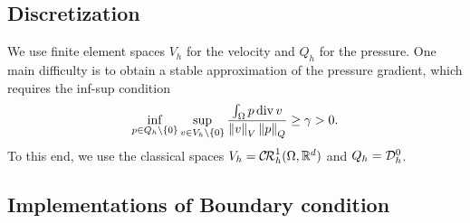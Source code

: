 \subsection{Discretization}\label{subsec:}
%
We use finite element spaces $V_h$ for the velocity and $Q_h$ for the pressure. One main difficulty is to obtain a stable approximation of the pressure gradient, which requires the inf-sup condition
%
\begin{equation}\label{eq:stokes:infsupgrad}
\inf_{p\in Q_h\setminus\left\{0\right\}}\sup_{v\in V_h\setminus\left\{0\right\}} \frac{\int_{\Omega}p\operatorname{div} v}{\left\|v\right\|_V\left\|p\right\|_Q} \ge \gamma >0.
\end{equation}
%
To this end, we use the classical spaces $V_h = \mathcal{C\!R}^1_h(\Omega,\mathbb R^d)$ and $Q_h=\mathcal{D}_h^0$.
%
\subsection{Implementations of Boundary condition}\label{subsec:}
%
%
